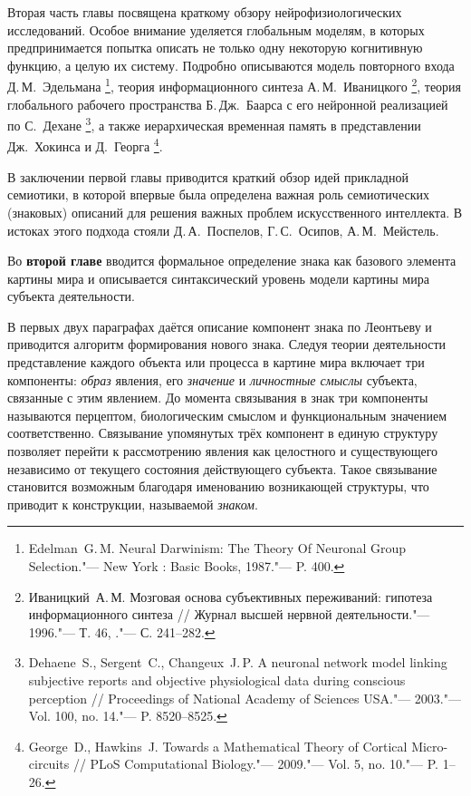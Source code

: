 Вторая часть главы посвящена краткому обзору нейрофизиологических исследований. Особое внимание уделяется глобальным моделям, в которых предпринимается попытка описать не только одну некоторую когнитивную функцию, а целую их систему. Подробно описываются модель повторного входа Д.\,М.~Эдельмана \footnote{Edelman~G.\,M. Neural Darwinism: The Theory Of Neuronal Group Selection."--- New York : Basic Books, 1987."--- P. 400.}, теория информационного синтеза А.\,М.~Иваницкого \footnote{Иваницкий~А.\,М. Мозговая основа субъективных переживаний: гипотеза информационного синтеза // Журнал высшей нервной деятельности."--- 1996."---	Т. 46, ."--- С. 241--282.}, теория глобального рабочего пространства Б.\,Дж.~Баарса с его нейронной реализацией по С.~Дехане \footnote{Dehaene~S., Sergent~C., Changeux~J.\,P. A neuronal network model linking subjective reports and objective physiological data during conscious perception // Proceedings of National	Academy of Sciences USA."--- 2003."--- Vol. 100, no. 14."--- P. 8520--8525.}, а также иерархическая временная память в представлении Дж.~Хокинса и Д.~Георга \footnote{George~D., Hawkins~J. Towards a Mathematical Theory of Cortical Micro-circuits // PLoS Computational Biology."--- 2009."--- Vol. 5, no. 10."--- P. 1--26.}.

В заключении первой главы приводится краткий обзор идей прикладной семиотики, в которой впервые была определена важная роль семиотических (знаковых) описаний для решения важных проблем искусственного интеллекта. В истоках этого подхода стояли Д.\,А.~Поспелов, Г.\,С.~Осипов, А.\,М.~Мейстель.

Во \textbf{второй главе} вводится формальное определение знака как базового элемента картины мира и описывается синтаксический уровень модели картины мира субъекта деятельности.

В первых двух параграфах даётся описание компонент знака по Леонтьеву и приводится алгоритм формирования нового знака. Следуя теории деятельности представление каждого объекта или процесса в картине мира включает три компоненты: \textit{образ} явления, его \textit{значение} и \textit{личностные смыслы} субъекта, связанные с этим явлением. До момента связывания в знак три компоненты называются перцептом, биологическим смыслом и функциональным значением соответственно. Связывание упомянутых трёх компонент в единую структуру позволяет перейти к рассмотрению явления как целостного и существующего независимо от текущего состояния действующего субъекта. Такое связывание становится возможным благодаря именованию возникающей структуры, что приводит к конструкции, называемой \textit{знаком}.

